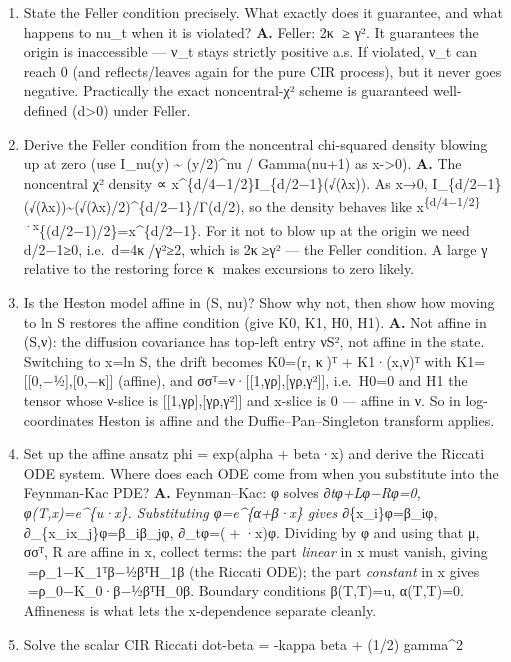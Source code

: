 \documentclass[
  11pt,
]{article}
\begin{document}
\begin{enumerate}
  samples.
\item
  State the Feller condition precisely. What exactly does it guarantee,
  and what happens to nu\_t when it is violated? \textbf{A.} Feller: 2κ
  ≥ γ². It guarantees the origin is inaccessible --- ν\_t stays strictly
  positive a.s. If violated, ν\_t can reach 0 (and reflects/leaves again
  for the pure CIR process), but it never goes negative. Practically the
  exact noncentral-χ² scheme is guaranteed well-defined (d\textgreater0)
  under Feller.
\item
  Derive the Feller condition from the noncentral chi-squared density
  blowing up at zero (use I\_nu(y) \textasciitilde{} (y/2)\^{}nu /
  Gamma(nu+1) as x-\textgreater0). \textbf{A.} The noncentral χ² density
  ∝ x\^{}\{d/4−1/2\}I\_\{d/2−1\}(√(λx)). As x→0,
  I\_\{d/2−1\}(√(λx))\textasciitilde(√(λx)/2)\^{}\{d/2−1\}/Γ(d/2), so
  the density behaves like
  x\textsuperscript{\{d/4−1/2\}·x}\{(d/2−1)/2\}=x\^{}\{d/2−1\}. For it
  not to blow up at the origin we need d/2−1≥0, i.e.~d=4κ/γ²≥2, which
  is 2κ≥γ² --- the Feller condition. A large γ relative to the
  restoring force κ makes excursions to zero likely.
\item
  Is the Heston model affine in (S, nu)? Show why not, then show how
  moving to ln S restores the affine condition (give K0, K1, H0, H1).
  \textbf{A.} Not affine in (S,ν): the diffusion covariance has top-left
  entry νS², not affine in the state. Switching to x=ln S, the drift
  becomes K0=(r, κ)ᵀ + K1·(x,ν)ᵀ with K1={[}{[}0,−½{]},{[}0,−κ{]}{]}
  (affine), and σσᵀ=ν·{[}{[}1,γρ{]},{[}γρ,γ²{]}{]}, i.e.~H0=0 and H1 the
  tensor whose ν-slice is {[}{[}1,γρ{]},{[}γρ,γ²{]}{]} and x-slice is 0
  --- affine in ν. So in log-coordinates Heston is affine and the
  Duffie--Pan--Singleton transform applies.
\item
  Set up the affine ansatz phi = exp(alpha + beta·x) and derive the
  Riccati ODE system. Where does each ODE come from when you substitute
  into the Feynman-Kac PDE? \textbf{A.} Feynman--Kac: φ solves
  ∂\emph{tφ+Lφ−Rφ=0, φ(T,x)=e\^{}\{u·x\}. Substituting φ=e\^{}\{α+β·x\}
  gives ∂}\{x\_i\}φ=β\_iφ, ∂\_\{x\_ix\_j\}φ=β\_iβ\_jφ, ∂\_tφ=(+·x)φ.
  Dividing by φ and using that μ, σσᵀ, R are affine in x, collect terms:
  the part \emph{linear} in x must vanish, giving =ρ\_1−K\_1ᵀβ−½βᵀH\_1β
  (the Riccati ODE); the part \emph{constant} in x gives
  =ρ\_0−K\_0·β−½βᵀH\_0β. Boundary conditions β(T,T)=u, α(T,T)=0.
  Affineness is what lets the x-dependence separate cleanly.
\item
  Solve the scalar CIR Riccati dot-beta = -kappa beta + (1/2) gamma\^{}2

\end{enumerate}
\end{document}
